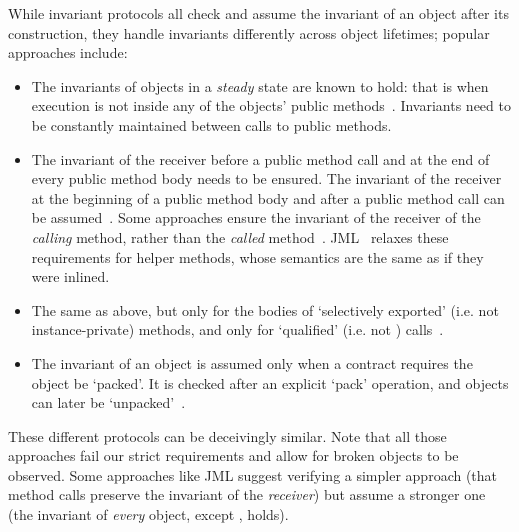 While invariant protocols all check and assume the invariant of an object after its construction, they handle invariants differently across object lifetimes; popular approaches include:%
\begin{itemize}
\item The invariants of objects in a \textit{steady} state are known to hold: that is when execution is not inside any of the objects' public methods~\cite{Gopinathan:2008:RMO:1483018.1483028}. Invariants need to be constantly maintained between calls to public methods.%
\item 
The invariant of the receiver before a public method call and at the end of every public method body needs to be ensured. The invariant of the receiver at the beginning of a public method body and after a public method call can be assumed~\cite{Burdy2005,drossopoulou2008unified}.  
Some approaches ensure the invariant of the receiver of the \emph{calling} method, rather than the \emph{called} method~\cite{DBLP:journals/scp/MullerPL06}.
JML~\cite{JML} relaxes these requirements for helper methods, whose semantics are the same as if they were inlined.


\item The same as above, but only for the bodies of `selectively exported' (i.e. not instance-private) methods, and only for `qualified' (i.e. not \Q@this@) calls~\cite{meyer2016class}.
\item The invariant of an object is assumed only when a contract requires the object be `packed'. It is checked after an explicit `pack' operation, and objects can later be `unpacked'~\cite{DBLP:journals/jot/BarnettDFLS04}.
\end{itemize}\SS\LS[0.5]
\noindent These different protocols can be deceivingly similar.
Note that all those approaches fail our strict requirements and allow for broken objects to be observed.
Some approaches like JML suggest verifying a simpler approach (that method calls preserve the invariant of the \emph{receiver}) but assume a stronger one (the invariant of \emph{every} object, except \Q@this@, holds).


